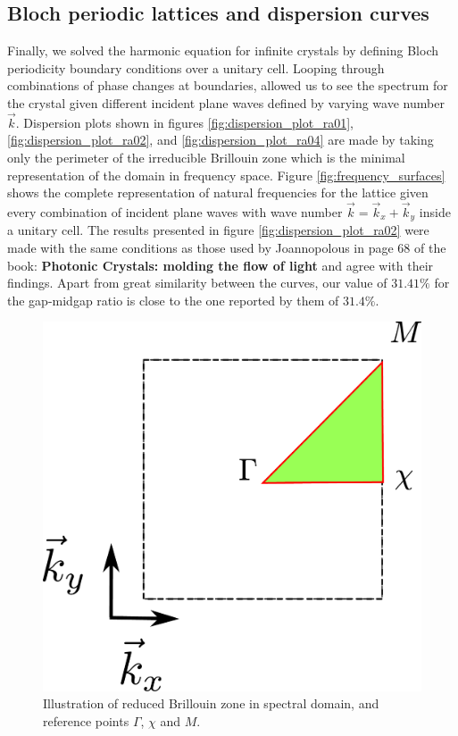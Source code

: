 \subsection{Bloch periodic lattices and dispersion curves}
Finally, we solved the harmonic equation for infinite crystals by defining Bloch periodicity boundary conditions over a unitary cell. Looping through combinations of phase changes at boundaries, allowed us to see the spectrum for the crystal given different incident plane waves defined by varying wave number $\vec{k}$. 
Dispersion plots shown in figures \ref{fig:dispersion_plot_ra01}, \ref{fig:dispersion_plot_ra02}, and \ref{fig:dispersion_plot_ra04} are made by taking only the perimeter of the irreducible Brillouin zone which is the minimal representation of the domain in frequency space. Figure \ref{fig:frequency_surfaces} shows the complete representation of natural frequencies for the lattice given every combination of incident plane waves with wave number $\vec{k} = \vec{k}_x+\vec{k}_y$ inside a unitary cell.
The results presented in figure \ref{fig:dispersion_plot_ra02} were made with the same conditions as those used by Joannopolous in page 68 of the book: \textbf{Photonic Crystals: molding the flow of light} \cite{Joannopoulos2008} and agree with their findings. Apart from great similarity between the curves, our value of $31.41\%$ for the gap-midgap ratio is close to the one reported by them of $31.4\%$.

\begin{figure}
\centering
\includegraphics[scale=0.2]{./img/reduced_brillouin_zone.pdf}
\caption{Illustration of reduced Brillouin zone in spectral domain, and reference points $\Gamma$, $\chi$ and $M$.}
\end{figure}
 
